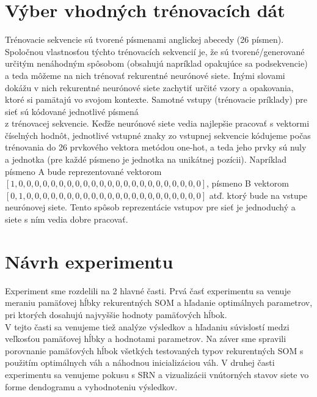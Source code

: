 \section{Výber vhodných trénovacích dát}
Trénovacie sekvencie sú tvorené písmenami anglickej abecedy (26 písmen).
Spoločnou vlastnosťou týchto trénovacích sekvencií je, že sú tvorené/generované určitým nenáhodným spôsobom (obsahujú napríklad opakujúce sa podsekvencie)
a teda môžeme na nich trénovať rekurentné neurónové siete. 
Inými slovami dokážu v nich rekurentné neurónové siete zachytiť určité vzory a opakovania, ktoré si pamätajú vo svojom kontexte.
Samotné vstupy (trénovacie príklady) pre sieť sú kódované jednotlivé písmená \\ z trénovacej sekvencie.
Keďže neurónové siete vedia najlepšie pracovať s vektormi číselných hodnôt, jednotlivé vstupné znaky zo 
vstupnej sekvencie kódujeme počas trénovania do 26 prvkového vektora metódou one-hot, 
a teda jeho prvky sú nuly a jednotka (pre každé písmeno je jednotka na unikátnej pozícii).
Napríklad písmeno A bude reprezentované vektorom
$[1, 0, 0, 0, 0, 0, 0, 0, 0, 0, 0, 0, 0, 0, 0, 0, 0, 0, 0, 0, 0, 0, 0, 0]$,
písmeno B vektorom $[0, 1, 0, 0, 0, 0, 0, 0, 0, 0, 0, 0, 0, 0, 0, 0, 0, 0, 0, 0, 0, 0, 0, 0]$ atď. 
ktorý bude na vstupe neurónovej siete.
Tento spôsob reprezentácie vstupov pre sieť je jednoduchý a siete s ním vedia dobre pracovať.


\section {Návrh experimentu}
Experiment sme rozdelili na 2 hlavné časti. 
Prvá časť experimentu sa venuje meraniu pamäťovej hĺbky rekurentných SOM a hľadanie 
optimálnych parametrov, pri ktorých dosahujú najvyššie hodnoty pamäťových hĺbok. \\
V tejto časti sa venujeme tiež analýze výsledkov a hľadaniu súvislostí medzi veľkosťou pamäťovej hĺbky 
a hodnotami parametrov. 
Na záver sme spravili porovnanie pamäťových hĺbok všetkých testovaných typov rekurentných SOM s 
použitím optimálnych váh a náhodnou inicializáciou váh.
V druhej časti experimentu sa venujeme pokusu s SRN a vizualizácii vnútorných stavov siete vo forme 
dendogramu a vyhodnoteniu výsledkov.

